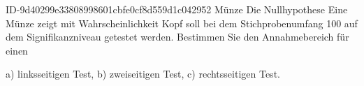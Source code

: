 \begin{exercise}
      {ID-9d40299e33808998601cbfe0cf8d559d1c042952}
      {Münze}
  \ifproblem\problem
    Die Nullhypothese \glqq Eine Münze zeigt mit  Wahrscheinlichkeit
    Kopf\grqq{} soll bei dem Stichprobenumfang 100 auf dem Signifikanzniveau
     getestet werden. Bestimmen Sie den Annahmebereich für einen
    \begin{center}
      a) linksseitigen Test,
      \qquad
      b) zweiseitigen Test,
      \qquad
      c) rechtsseitigen Test.
    \end{center}
  \fi
\end{exercise}
